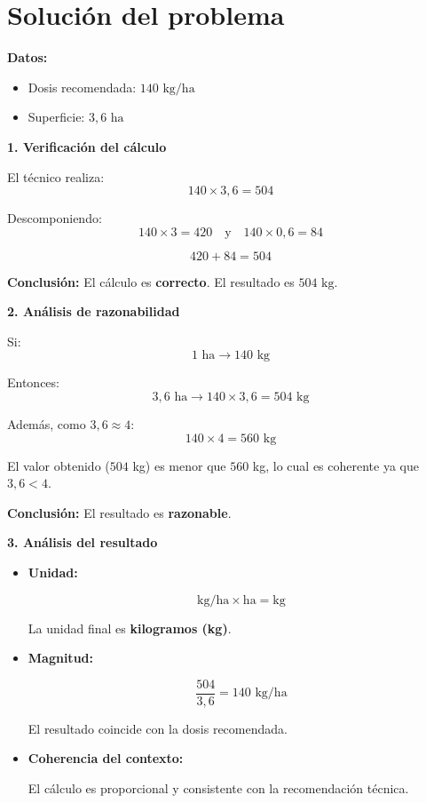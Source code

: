 \documentclass[12pt]{article}
\begin{document}
	
	\section*{Solución del problema}
	
	\textbf{Datos:}
	
	\begin{itemize}
		\item Dosis recomendada: $140 \text{ kg/ha}$
		\item Superficie: $3{,}6 \text{ ha}$
	\end{itemize}
	
	\vspace{0.3cm}
	
	\textbf{1. Verificación del cálculo}
	
	El técnico realiza:
	\[
	140 \times 3{,}6 = 504
	\]
	
	Descomponiendo:
	\[
	140 \times 3 = 420 \quad \text{y} \quad 140 \times 0{,}6 = 84
	\]
	
	\[
	420 + 84 = 504
	\]
	
	\textbf{Conclusión:} El cálculo es \textbf{correcto}. El resultado es $504 \text{ kg}$.
	
	\vspace{0.3cm}
	
	\textbf{2. Análisis de razonabilidad}
	
	Si:
	\[
	1 \text{ ha} \rightarrow 140 \text{ kg}
	\]
	
	Entonces:
	\[
	3{,}6 \text{ ha} \rightarrow 140 \times 3{,}6 = 504 \text{ kg}
	\]
	
	Además, como $3{,}6 \approx 4$:
	\[
	140 \times 4 = 560 \text{ kg}
	\]
	
	El valor obtenido ($504$ kg) es menor que $560$ kg, lo cual es coherente ya que $3{,}6 < 4$.
	
	\textbf{Conclusión:} El resultado es \textbf{razonable}.
	
	\vspace{0.3cm}
	
	\textbf{3. Análisis del resultado}
	
	\begin{itemize}
		\item \textbf{Unidad:}
		
		\[
		\text{kg/ha} \times \text{ha} = \text{kg}
		\]
		
		La unidad final es \textbf{kilogramos (kg)}.
		
		\item \textbf{Magnitud:}
		
		\[
		\frac{504}{3{,}6} = 140 \text{ kg/ha}
		\]
		
		El resultado coincide con la dosis recomendada.
		
		\item \textbf{Coherencia del contexto:}
		
		El cálculo es proporcional y consistente con la recomendación técnica.
	\end{itemize}
	
\end{document}
